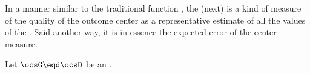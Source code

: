 In a manner similar to the traditional  function ,
the  (next) is a kind of measure of the quality of the outcome center as a representative estimate 
of all the values of the .
Said another way, it is in essence the expected error of the center measure.
\begin{definition}
\label{def:ocsVarG}
Let $\ocsG\eqd\ocsD$ be an  .
\\
\end{definition}

